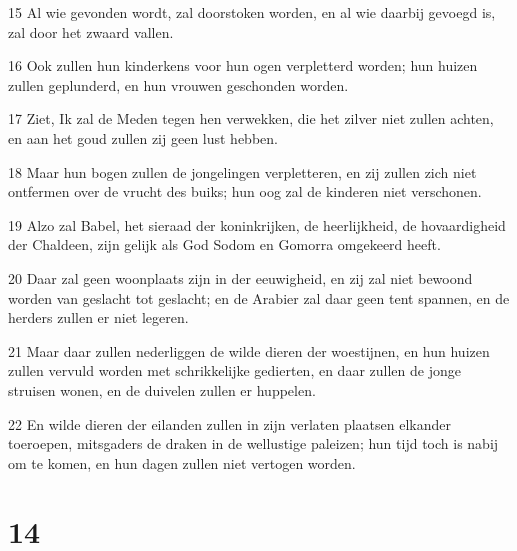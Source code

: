 \par 15 Al wie gevonden wordt, zal doorstoken worden, en al wie daarbij gevoegd is, zal door het zwaard vallen.
\par 16 Ook zullen hun kinderkens voor hun ogen verpletterd worden; hun huizen zullen geplunderd, en hun vrouwen geschonden worden.
\par 17 Ziet, Ik zal de Meden tegen hen verwekken, die het zilver niet zullen achten, en aan het goud zullen zij geen lust hebben.
\par 18 Maar hun bogen zullen de jongelingen verpletteren, en zij zullen zich niet ontfermen over de vrucht des buiks; hun oog zal de kinderen niet verschonen.
\par 19 Alzo zal Babel, het sieraad der koninkrijken, de heerlijkheid, de hovaardigheid der Chaldeen, zijn gelijk als God Sodom en Gomorra omgekeerd heeft.
\par 20 Daar zal geen woonplaats zijn in der eeuwigheid, en zij zal niet bewoond worden van geslacht tot geslacht; en de Arabier zal daar geen tent spannen, en de herders zullen er niet legeren.
\par 21 Maar daar zullen nederliggen de wilde dieren der woestijnen, en hun huizen zullen vervuld worden met schrikkelijke gedierten, en daar zullen de jonge struisen wonen, en de duivelen zullen er huppelen.
\par 22 En wilde dieren der eilanden zullen in zijn verlaten plaatsen elkander toeroepen, mitsgaders de draken in de wellustige paleizen; hun tijd toch is nabij om te komen, en hun dagen zullen niet vertogen worden.

\chapter{14}


